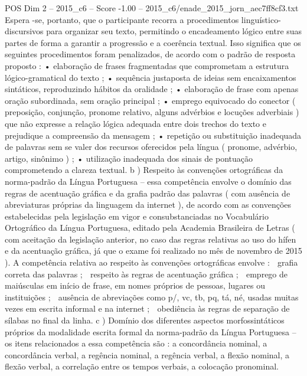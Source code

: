 \begin{textsample}{POS Dim 2 – 2015\_c6 – Score -1.00 – 2015\_c6/enade\_2015\_jorn\_aec7ff8cf3.txt}
Espera -se, portanto, que o participante recorra a procedimentos linguístico-discursivos para organizar seu texto, permitindo o encadeamento lógico entre suas partes de forma a garantir a progressão e a coerência textual.
Isso significa que os seguintes procedimentos foram penalizados, de acordo com o padrão de resposta proposto : • elaboração de frases fragmentadas que comprometam a estrutura lógico-gramatical do texto ; • sequência justaposta de ideias sem encaixamentos sintáticos, reproduzindo hábitos da oralidade ; • elaboração de frase com apenas oração subordinada, sem oração principal ; • emprego equivocado do conector ( preposição, conjunção, pronome relativo, alguns advérbios e locuções adverbiais ) que não expresse a relação lógica adequada entre dois trechos do texto e prejudique a compreensão da mensagem ; • repetição ou substituição inadequada de palavras sem se valer dos recursos oferecidos pela língua ( pronome, advérbio, artigo, sinônimo ) ; • utilização inadequada dos sinais de pontuação comprometendo a clareza textual. b ) Respeito às convenções ortográficas da norma-padrão da Língua Portuguesa – essa competência envolve o domínio das regras de acentuação gráfica e da grafia padrão das palavras ( com ausência de abreviaturas próprias da linguagem da internet ), de acordo com as convenções estabelecidas pela legislação em vigor e consubstanciadas no Vocabulário Ortográfico da Língua Portuguesa, editado pela Academia Brasileira de Letras ( com aceitação da legislação anterior, no caso das regras relativas ao uso do hífen e da acentuação gráfica, já que o exame foi realizado no mês de novembro de 2015 ).
A competência relativa ao respeito às convenções ortográficas envolve :  grafia correta das palavras ;  respeito às regras de acentuação gráfica ;  emprego de maiúsculas em início de frase, em nomes próprios de pessoas, lugares ou instituições ;  ausência de abreviações como p/, vc, tb, pq, tá, né, usadas muitas vezes em escrita informal e na internet ;  obediência às regras de separação de sílabas no final da linha. c ) Domínio dos diferentes aspectos morfossintáticos próprios da modalidade escrita formal da norma-padrão da Língua Portuguesa – os itens relacionados a essa competência são : a concordância nominal, a concordância verbal, a regência nominal, a regência verbal, a flexão nominal, a flexão verbal, a correlação entre os tempos verbais, a colocação pronominal.

\end{textsample}
